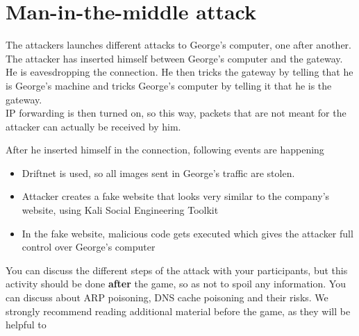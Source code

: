 \section{Man-in-the-middle attack}

The attackers launches different attacks to George's computer, one after another.
\\

The attacker has inserted himself between George's computer and the gateway. He is eavesdropping the connection.
He then tricks the gateway by telling that he is George's machine and tricks George's computer by telling it that he is the gateway. 
\\
IP forwarding is then turned on, so this way, packets that are not meant for the attacker can actually be received by him.

After he inserted himself in the connection, following events are happening

\begin{itemize}
    \item Driftnet is used, so all images sent in George's traffic are stolen.
    \item Attacker creates a fake website that looks very similar to the company's website, using Kali Social Engineering Toolkit
    \item In the fake website, malicious code gets executed which gives the attacker full control over George's computer
\end{itemize}


\begin{hint}
    You can discuss the different steps of the attack with your participants, but this activity should be done \textbf{after} the game, so as not to spoil any information.
    You can discuss about ARP poisoning, DNS cache poisoning and their risks. 
    We strongly recommend reading additional material before the game, as they will be helpful to
\end{hint}
